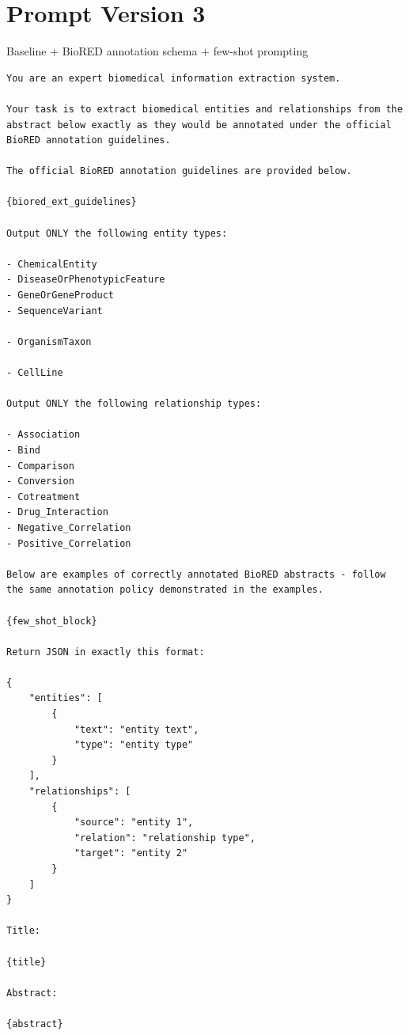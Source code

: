 \section{Prompt Version 3}
Baseline + BioRED annotation schema + few-shot prompting
\begin{lstlisting}
You are an expert biomedical information extraction system.

Your task is to extract biomedical entities and relationships from the abstract below exactly as they would be annotated under the official BioRED annotation guidelines.

The official BioRED annotation guidelines are provided below.

{biored_ext_guidelines}

Output ONLY the following entity types:

- ChemicalEntity
- DiseaseOrPhenotypicFeature
- GeneOrGeneProduct
- SequenceVariant

- OrganismTaxon

- CellLine

Output ONLY the following relationship types:

- Association
- Bind
- Comparison
- Conversion
- Cotreatment
- Drug_Interaction
- Negative_Correlation
- Positive_Correlation

Below are examples of correctly annotated BioRED abstracts - follow the same annotation policy demonstrated in the examples.

{few_shot_block}

Return JSON in exactly this format:

{
	"entities": [
		{
			"text": "entity text",
			"type": "entity type"
		}
	],
	"relationships": [
		{
			"source": "entity 1",
			"relation": "relationship type",
			"target": "entity 2"
		}
	]
}

Title:

{title}

Abstract:

{abstract}
\end{lstlisting}


